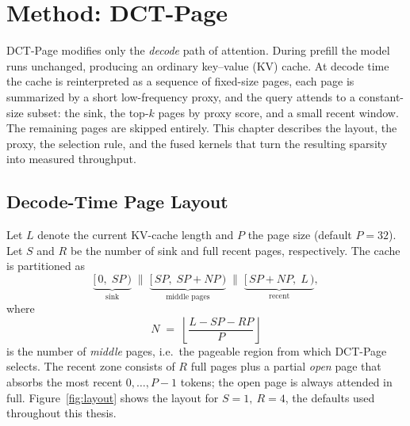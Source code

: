 \chapter{Method: DCT-Page}\label{chap:method}

DCT-Page modifies only the \emph{decode} path of attention.
During prefill the model runs unchanged, producing an ordinary
key--value (KV) cache.  At decode time the cache is reinterpreted as a
sequence of fixed-size pages, each page is summarized by a short
low-frequency proxy, and the query attends to a constant-size subset:
the sink, the top-$k$ pages by proxy score, and a small recent window.
The remaining pages are skipped entirely.
This chapter describes the layout, the proxy, the selection rule, and
the fused kernels that turn the resulting sparsity into measured
throughput.


\section{Decode-Time Page Layout}\label{sec:layout}

Let $L$ denote the current KV-cache length and $P$ the page size
(default $P{=}32$).  Let $S$ and $R$ be the number of sink and full
recent pages, respectively.  The cache is partitioned as
\begin{equation}\label{eq:layout}
  \underbrace{[\,0,\; SP\,)}_{\text{sink}}\;\Big\|\;
  \underbrace{[\,SP,\; SP{+}NP\,)}_{\text{middle pages}}\;\Big\|\;
  \underbrace{[\,SP{+}NP,\; L\,)}_{\text{recent}},
\end{equation}
where
\begin{equation}\label{eq:num-pages}
  N \;=\; \left\lfloor \frac{L - SP - RP}{P} \right\rfloor
\end{equation}
is the number of \emph{middle} pages, i.e.\ the pageable region from
which DCT-Page selects.
The recent zone consists of $R$ full pages plus a partial \emph{open}
page that absorbs the most recent $0,\dots,P{-}1$ tokens; the open page
is always attended in full.
Figure~\ref{fig:layout} shows the layout for $S{=}1,\ R{=}4$, the
defaults used throughout this thesis.

